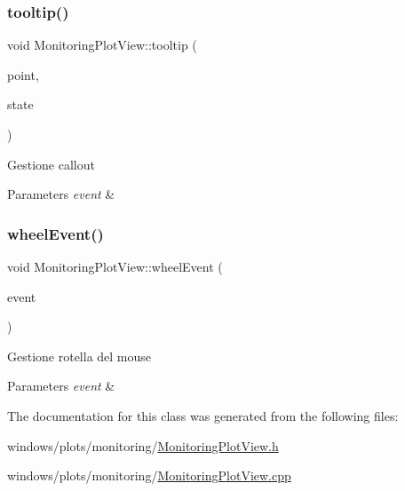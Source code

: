 \subsubsection{\texorpdfstring{tooltip()}{tooltip()}}
{\footnotesize\ttfamily void Monitoring\+Plot\+View\+::tooltip (\begin{DoxyParamCaption}\item[{Q\+PointF}]{point,  }\item[{bool}]{state }\end{DoxyParamCaption})}

Gestione callout 
\begin{DoxyParams}{Parameters}
{\em event} & \\
\hline
\end{DoxyParams}
\mbox{\label{class_monitoring_plot_view_a72ad09274ce92ddf7893b526d31f7589}} 
\subsubsection{\texorpdfstring{wheel\+Event()}{wheelEvent()}}
{\footnotesize\ttfamily void Monitoring\+Plot\+View\+::wheel\+Event (\begin{DoxyParamCaption}\item[{Q\+Wheel\+Event $\ast$}]{event }\end{DoxyParamCaption})}

Gestione rotella del mouse 
\begin{DoxyParams}{Parameters}
{\em event} & \\
\hline
\end{DoxyParams}


The documentation for this class was generated from the following files\+:\begin{DoxyCompactItemize}
\item 
windows/plots/monitoring/\hyperlink{_monitoring_plot_view_8h}{Monitoring\+Plot\+View.\+h}\item 
windows/plots/monitoring/\hyperlink{_monitoring_plot_view_8cpp}{Monitoring\+Plot\+View.\+cpp}\end{DoxyCompactItemize}
